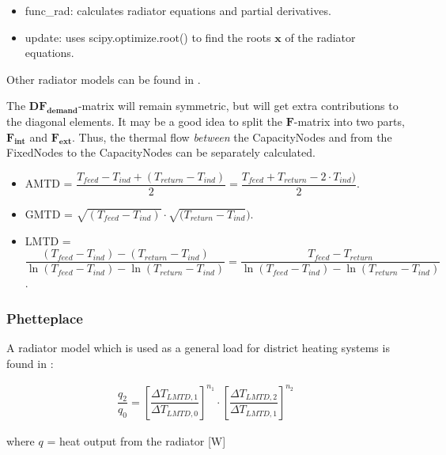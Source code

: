\begin{itemize}
	\item \textsf{func\_rad}: calculates radiator equations and partial derivatives.
	\item \textsf{update}: uses \textsf{scipy.optimize.root()} to find the roots $\mathbf{x}$ of the radiator equations.
\end{itemize}

Other radiator models can be found in \cite{TolRadiator, TolThesis}.




The $\mathbf{DF_{demand}}$-matrix will remain symmetric, but will get extra contributions to the diagonal elements. It may be a good idea to split the $\mathbf{F}$-matrix into two parts, $\mathbf{F_{int}}$ and $\mathbf{F_{ext}}$. Thus, the thermal flow \emph{between} the \textsf{CapacityNodes} and from the \textsf{FixedNodes} to the \textsf{CapacityNodes} can be separately calculated.

\begin{itemize}
	\item AMTD = $\dfrac{T_{feed} - T_{ind} + (T_{return} - T_{ind})}{2} = 
	\dfrac{T_{feed} + T_{return} - 2 \cdot T_{ind})}{2}$.
	\item GMTD = $\sqrt{(T_{feed} - T_{ind})} \cdot  \sqrt{(T_{return} - T_{ind}})$.
	\item LMTD = $\dfrac{(T_{feed} - T_{ind}) - (T_{return} - T_{ind})}{\ln(T_{feed} - T_{ind}) -\ln(T_{return} - T_{ind})} = \dfrac{T_{feed} - T_{return}}{\ln(T_{feed} - T_{ind}) -\ln(T_{return} - T_{ind})}$.
\end{itemize}



\subsubsection{Phetteplace}

A radiator model which is used as  a general load for district heating systems is found in \cite{etde_6539997}:

\begin{equation}
	\begin{aligned}
		\dfrac{q_2}{q_0} = \left[\dfrac{\Delta T_{LMTD,1}}{\Delta T_{LMTD,0}}\right]^{n_1} \cdot \left[\dfrac{\Delta T_{LMTD,2}}{\Delta T_{LMTD,1}}\right]^{n_2}
	\end{aligned}
	\label{eq:Boehm}
\end{equation}

where $q$ = heat output from the radiator [W]

